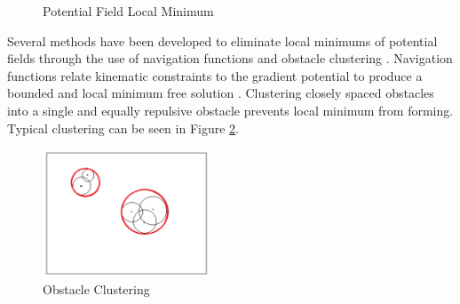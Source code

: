 \documentclass[numbered,pdftex]{ohio-etd}
\begin{document}
\begin{figure}[H]
	\begin{subfigmatrix}{2}%
		\centering
	\end{subfigmatrix}
	\caption{Potential Field Local Minimum \cite{liu_virtual-waypoint_2016}}
	\label{fig:pfLocalMin}
\end{figure}


Several methods have been developed to eliminate local minimums of potential fields through the use of navigation functions \cite{goerzen_survey_2010} and obstacle clustering \cite{liu_virtual-waypoint_2016}. Navigation functions relate kinematic constraints to the gradient potential to produce a bounded and local minimum free solution \cite{rimon_exact_1992}. Clustering closely spaced obstacles into a single and equally repulsive obstacle prevents local minimum from forming. Typical clustering can be seen in Figure \ref{fig:obstacleclustering}. 

\begin{figure}[H]
	\centering
	\includegraphics[width=5cm]{PaperFigures/obstacleClustering}
	\caption{Obstacle Clustering \cite{liu_virtual-waypoint_2016}}
	\label{fig:obstacleclustering}
\end{figure}
\end{document}
